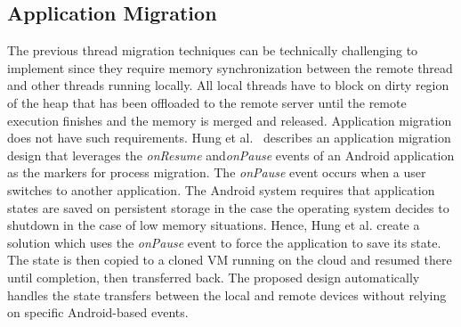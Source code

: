 \subsection{Application Migration}
\label{intro:app_migration}
%
The previous thread migration techniques can be technically challenging
to implement since they require memory synchronization between the
remote thread and other threads running locally.
%
All local threads have to block on dirty region of the heap that has
been offloaded to the remote server until the remote execution finishes
and the memory is merged and released.
%
Application migration does not have such requirements.
%
Hung et al.~\cite{hung} describes an application migration design that
leverages the \textit{onResume} and\textit{onPause} events of an Android
application as the markers for process migration.
%
The \textit{onPause} event occurs when a user switches to another
application.
%
The Android system requires that application states are saved on
persistent storage in the case the operating system decides to shutdown
in the case of low memory situations.
%
Hence, Hung et al. create a solution which uses the \textit{onPause}
event to force the application to save its state.
%
The state is then copied to a cloned VM running on the cloud and resumed
there until completion, then transferred back.
%
The proposed design automatically handles the state transfers between
the local and remote devices without relying on specific Android-based
events.
%
